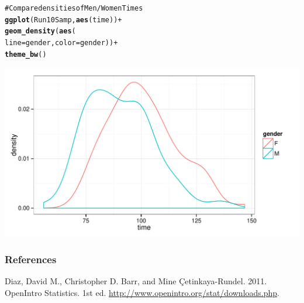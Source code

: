 \documentclass{beamer}\usepackage{graphicx, color}
\makeatletter
\def\maxwidth{ %
  \ifdim\Gin@nat@width>\linewidth
    \linewidth
  \else
    \Gin@nat@width
  \fi
}
\newcommand{\hlfunctioncall}[1]{\textcolor[rgb]{0.501960784313725,0,0.329411764705882}{\textbf{#1}}}%
\newcommand{\hlcomment}[1]{\textcolor[rgb]{0.180392156862745,0.6,0.341176470588235}{#1}}%
\newenvironment{kframe}{%
 \def\at@end@of@kframe{}%
 \ifinner\ifhmode%
  \def\at@end@of@kframe{\end{minipage}}%
  \begin{minipage}{\columnwidth}%
 \fi\fi%
 \def\FrameCommand##1{\hskip\@totalleftmargin \hskip-\fboxsep
 \colorbox{shadecolor}{##1}\hskip-\fboxsep
     \hskip-\linewidth \hskip-\@totalleftmargin \hskip\columnwidth}%
 \MakeFramed {\advance\hsize-\width
   \@totalleftmargin\z@ \linewidth\hsize
   \@setminipage}}%
 {\par\unskip\endMakeFramed%
 \at@end@of@kframe}
\newenvironment{knitrout}{}{} %
\makeatother
\begin{document}
\begin{frame}
\begin{knitrout}
\color{fgcolor}\begin{kframe}
\begin{alltt}
\hlcomment{# Compare densities of Men/Women Times}
\hlfunctioncall{ggplot}(Run10Samp, \hlfunctioncall{aes}(time)) +
        \hlfunctioncall{geom_density}(\hlfunctioncall{aes}(
          line = gender, color = gender)) +
        \hlfunctioncall{theme_bw}()
\end{alltt}
\end{kframe}

{\centering \includegraphics[width=\maxwidth]{figure/GenderDist} 

}


\end{knitrout}

\end{frame}



\begin{frame}[allowframebreaks]
  \frametitle{References}
  Diaz, David M., Christopher D. Barr, and Mine \c{C}etinkaya-Rundel. 2011. OpenIntro Statistics. 1st ed. \url{http://www.openintro.org/stat/downloads.php}. \\[0.25cm] 
\end{frame}
\end{document}
